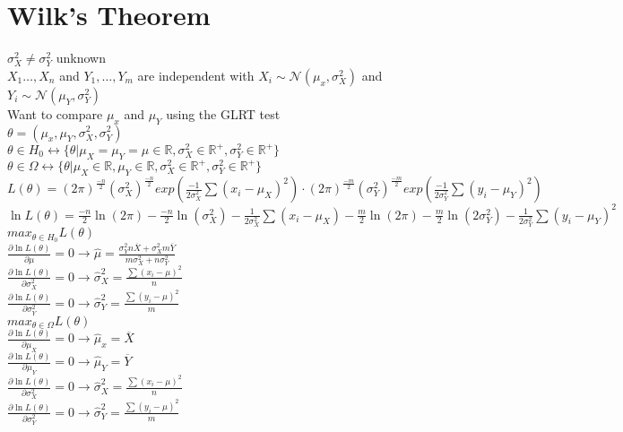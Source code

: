 \documentclass{article}
\begin{document}
\section{Wilk's Theorem}
\label{sec:wilk}
$\sigma_X^2\neq\sigma_Y^2$ unknown\\
$X_1\dots,X_n$ and $Y_1,\dots,Y_m$ are independent with $X_i\sim\mathcal{N}(\mu_x,\sigma^2_X)$ and $Y_i\sim\mathcal{N}(\mu_Y,\sigma^2_Y)$\\
Want to compare $\mu_x$ and $\mu_Y$ using the GLRT test\\
\newline
$\theta=(\mu_x,\mu_Y,\sigma_X^2,\sigma_Y^2)$\\
$\theta\in H_0 \leftrightarrow\{\theta\vert\mu_X=\mu_Y=\mu\in\mathbb{R},\sigma_X^2\in\mathbb{R}^+,\sigma_Y^2\in\mathbb{R}^+\}$\\
$\theta\in\Omega\leftrightarrow\{\theta\vert\mu_X\in\mathbb{R},\mu_Y\in\mathbb{R},\sigma_X^2\in\mathbb{R}^+,\sigma_Y^2\in\mathbb{R}^+\}$\\
$L(\theta)=(2\pi)^\frac{-n}{2}(\sigma_X^2)^\frac{-n}{2}exp(\frac{-1}{2\sigma_X^2}\sum(x_i-\mu_X)^2)\cdot(2\pi)^\frac{-m}{2}(\sigma_Y^2)^\frac{-m}{2}exp(\frac{-1}{2\sigma_Y^2}\sum(y_i-\mu_Y)^2)$\\
$\ln L(\theta)=\frac{-n}{2}\ln(2\pi)-\frac{-n}{2}\ln(\sigma_X^2)-\frac{1}{2\sigma_X^2}\sum(x_i-\mu_X)-\frac{m}{2}\ln(2\pi)-\frac{m}{2}\ln(2\sigma_Y^2)-\frac{1}{2\sigma_Y^2}\sum(y_i-\mu_Y)^2$\\
$max_{\theta\in H_0}L(\theta)$\\
$\frac{\partial\ln L(\theta)}{\partial\mu}=0\rightarrow \hat\mu=\frac{\sigma_Y^2n\overline{X}+\sigma_X^2m\overline{Y}}{m\sigma_X^2+n\sigma_Y^2}$\\
$\frac{\partial\ln L(\theta)}{\partial\sigma_X^2}=0\rightarrow\hat\sigma_X^2=\frac{\sum(x_i-\mu)^2}{n}$\\
$\frac{\partial\ln L(\theta)}{\partial\sigma_Y^2}=0\rightarrow\hat\sigma_Y^2=\frac{\sum(y_i-\mu)^2}{m}$\\
$max_{\theta\in\Omega}L(\theta)$\\
$\frac{\partial\ln L(\theta)}{\partial\mu_X}=0\rightarrow\hat\mu_x=\overline{X}$\\
$\frac{\partial\ln L(\theta)}{\partial\mu_Y}=0\rightarrow\hat\mu_Y=\overline{Y}$\\
$\frac{\partial\ln L(\theta)}{\partial\sigma_X^2}=0\rightarrow\hat\sigma_X^2=\frac{\sum(x_i-\mu)^2}{n}$\\
$\frac{\partial\ln L(\theta)}{\partial\sigma_Y^2}=0\rightarrow\hat\sigma_Y^2=\frac{\sum(y_i-\mu)^2}{m}$\\
\end{document}
